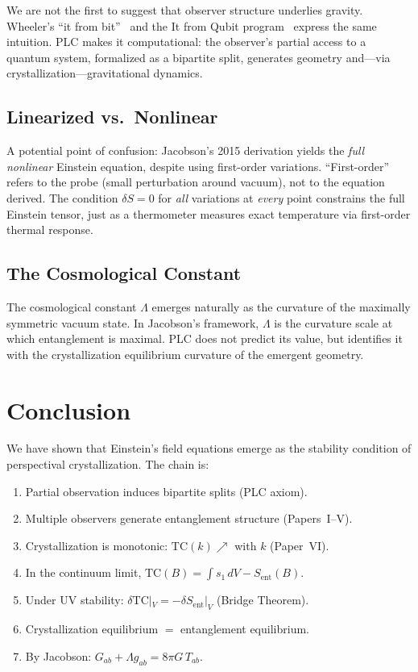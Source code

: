 \documentclass[aps,pra,twocolumn,superscriptaddress,floatfix]{revtex4-2}
\begin{document}
We are not the first to suggest that observer structure underlies gravity.
Wheeler's ``it from bit''~\cite{wheeler1990} and the It from Qubit program~\cite{vanraamsdonk2010} express the same intuition.
PLC makes it computational: the observer's partial access to a quantum system, formalized as a bipartite split, generates geometry and---via crystallization---gravitational dynamics.

\subsection{Linearized vs.\ Nonlinear}

A potential point of confusion: Jacobson's 2015 derivation yields the \emph{full nonlinear} Einstein equation, despite using first-order variations.
``First-order'' refers to the probe (small perturbation around vacuum), not to the equation derived.
The condition $\delta S = 0$ for \emph{all} variations at \emph{every} point constrains the full Einstein tensor, just as a thermometer measures exact temperature via first-order thermal response.

\subsection{The Cosmological Constant}

The cosmological constant $\Lambda$ emerges naturally as the curvature of the maximally symmetric vacuum state.
In Jacobson's framework, $\Lambda$ is the curvature scale at which entanglement is maximal.
PLC does not predict its value, but identifies it with the crystallization equilibrium curvature of the emergent geometry.


\section{Conclusion}
\label{sec:conclusion}

We have shown that Einstein's field equations emerge as the stability condition of perspectival crystallization.
The chain is:
\begin{enumerate}
\item Partial observation induces bipartite splits (PLC axiom).
\item Multiple observers generate entanglement structure (Papers~I--V).
\item Crystallization is monotonic: $\mathrm{TC}(k) \nearrow$ with $k$ (Paper~VI).
\item In the continuum limit, $\mathrm{TC}(B) = \int s_1 \, dV - S_{\mathrm{ent}}(B)$.
\item Under UV stability: $\delta\mathrm{TC}|_V = -\delta S_{\mathrm{ent}}|_V$ (Bridge Theorem).
\item Crystallization equilibrium $=$ entanglement equilibrium.
\item By Jacobson: $G_{ab} + \Lambda g_{ab} = 8\pi G \, T_{ab}$.
\end{enumerate}
\end{document}
